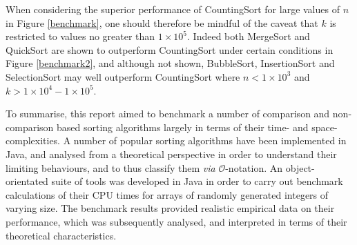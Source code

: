 \documentclass[12pt,a4paper]{article}
\begin{document}
When considering the superior performance of CountingSort for large values of $n$ in Figure \ref{benchmark}, one should therefore be mindful of the caveat that $k$ is restricted to values no greater than $1\times10^5$. Indeed both MergeSort and QuickSort are shown to outperform CountingSort under certain conditions in Figure \ref{benchmark2}, and although not shown, BubbleSort, InsertionSort and SelectionSort may well outperform CountingSort where $n < 1\times10^3$ and $k > 1\times10^4-1\times10^5$.

To summarise, this report aimed to benchmark a number of comparison and non-comparison based sorting algorithms largely in terms of their time- and space-complexities. A number of popular sorting algorithms have been implemented in Java, and analysed from a theoretical perspective in order to understand their limiting behaviours, and to thus classify them \emph{via} $\mathcal{O}$-notation. An object-orientated suite of tools was developed in Java in order to carry out benchmark calculations of their CPU times for arrays of randomly generated integers of varying size. The benchmark results provided realistic empirical data on their performance, which was subsequently analysed, and interpreted in terms of their theoretical characteristics.
\end{document}
